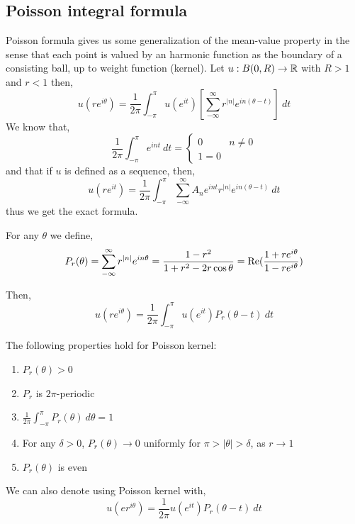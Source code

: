 \subsection{Poisson integral formula}
Poisson formula gives us some generalization of the mean-value property in the sense that each point is valued by an harmonic function as the boundary of a consisting ball, up to weight function (kernel).
Let $u : B(0, R) \to \mathbb{R}$ with $R > 1$ and $r < 1$ then,
\[
	u(r e^{i \theta})
	= \frac{1}{2 \pi} \int_{- \pi}^{\pi} u(e^{i t}) \left[ \sum_{- \infty}^\infty r^{|n|} e^{i n (\theta - t)} \right]\ dt
\]
We know that,
\[
	\frac{1}{2 \pi} \int_{- \pi}^{\pi} e^{i n t}\ dt
	= \begin{cases}
		0 & n \ne 0 \\
		1 = 0
	\end{cases}
\]
and that if $u$ is defined as a sequence, then,
\[
	u(r e^{i t})
	= \frac{1}{2 \pi} \int_{- \pi}^{\pi} \sum_{- \infty}^\infty A_n e^{i n t} r^{|n|} e^{i n (\theta - t)}\ dt
\]
thus we get the exact formula.
\begin{definition}
	For any $\theta$ we define,
	\[
		P_r(\theta)
		= \sum_{- \infty}^\infty r^{|n|} e^{i n \theta}
		= \frac{1 - r^2}{1 + r^2 - 2 r \cos \theta}
		= \operatorname{Re}(\frac{1 + r e^{i \theta}}{1 - r e^{i \theta}})
	\]
\end{definition}
Then,
\[
	u(r e^{i \theta})
	= \frac{1}{2 \pi} \int_{- \pi}^{\pi} u(e^{i t}) P_r(\theta - t)\ dt
\]
\begin{proposition}
	The following properties hold for Poisson kernel:
	\begin{enumerate}
		\item $P_r(\theta) > 0$
		\item $P_r$ is $2 \pi$-periodic
		\item $\frac{1}{2 \pi} \int_{- \pi}^\pi P_r(\theta)\ d \theta = 1$
		\item For any $\delta > 0$, $P_r(\theta) \to 0$ uniformly for $\pi > | \theta | > \delta$, as $r \to 1$
		\item $P_r(\theta)$ is even
	\end{enumerate}
\end{proposition}
\begin{remark}
	We can also denote using Poisson kernel with,
	\[
		u(e r^{i \theta})
		= \frac{1}{2 \pi} u(e^{i t}) P_r(\theta - t)\ dt
	\]
\end{remark}

